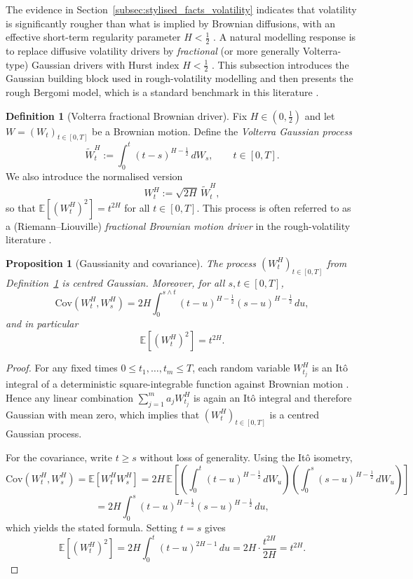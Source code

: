 \documentclass[12pt,a4paper]{article}
\theoremstyle{definition}
\newtheorem{definition}{Definition}[section]
\theoremstyle{plain}
\newtheorem{proposition}{Proposition}[section]
\theoremstyle{remark}
\theoremstyle{plain}
\begin{document}
The evidence in Section~\ref{subsec:stylised_facts_volatility} indicates that volatility is significantly rougher than what is implied by Brownian diffusions, with an effective short-term regularity parameter $H<\tfrac12$ \cite{GatheralRough}. 
A natural modelling response is to replace diffusive volatility drivers by \emph{fractional} (or more generally Volterra-type) Gaussian drivers with Hurst index $H<\tfrac12$ \cite{GatheralRough,BayerFriz2016}. 
This subsection introduces the Gaussian building block used in rough-volatility modelling and then presents the rough Bergomi model, which is a standard benchmark in this literature \cite{BayerFriz2016,RoughSurvey}.

\begin{definition}[Volterra fractional Brownian driver]
\label{def:volterra_driver}
Fix $H\in(0,\tfrac12)$ and let $W=(W_t)_{t\in[0,T]}$ be a Brownian motion. 
Define the \emph{Volterra Gaussian process}
\[
    \widetilde W^H_t
    :=
    \int_0^t (t-s)^{H-\frac12}\, dW_s,
    \qquad t\in[0,T].
\]
We also introduce the normalised version
\[
    W^H_t := \sqrt{2H}\,\widetilde W^H_t,
\]
so that $\mathbb E[(W^H_t)^2]=t^{2H}$ for all $t\in[0,T]$.
This process is often referred to as a (Riemann--Liouville) \emph{fractional Brownian motion driver} in the rough-volatility literature \cite{GatheralRough,BayerFriz2016}.
\end{definition}

\begin{proposition}[Gaussianity and covariance]
\label{prop:gaussian_covariance}
The process $(W^H_t)_{t\in[0,T]}$ from Definition~\ref{def:volterra_driver} is centred Gaussian. Moreover, for all $s,t\in[0,T]$,
\[
    \mathrm{Cov}(W^H_t,W^H_s)
    =
    2H \int_0^{s\wedge t} (t-u)^{H-\frac12}(s-u)^{H-\frac12}\, du,
\]
and in particular
\[
    \mathbb E[(W^H_t)^2]=t^{2H}.
\]
\end{proposition}

\begin{proof}
For any fixed times $0\le t_1,\dots,t_m\le T$, each random variable $W^H_{t_j}$ is an It\^o integral of a deterministic square-integrable function against Brownian motion \cite{GatheralRough,BayerFriz2016}. 
Hence any linear combination $\sum_{j=1}^m a_j W^H_{t_j}$ is again an It\^o integral and therefore Gaussian with mean zero, which implies that $(W^H_t)_{t\in[0,T]}$ is a centred Gaussian process.

For the covariance, write $t\ge s$ without loss of generality. Using the It\^o isometry,
\[
    \mathrm{Cov}(W^H_t,W^H_s)
    =
    \mathbb E[W^H_t W^H_s]
    =
    2H\,\mathbb E\!\left[
        \left(\int_0^t (t-u)^{H-\frac12}\, dW_u\right)
        \left(\int_0^s (s-u)^{H-\frac12}\, dW_u\right)
    \right]
\]
\[
    =
    2H \int_0^{s} (t-u)^{H-\frac12}(s-u)^{H-\frac12}\, du,
\]
which yields the stated formula. Setting $t=s$ gives
\[
    \mathbb E[(W^H_t)^2]
    =
    2H \int_0^{t} (t-u)^{2H-1}\, du
    =
    2H \cdot \frac{t^{2H}}{2H}
    =
    t^{2H}.
\]
\end{proof}
\end{document}
